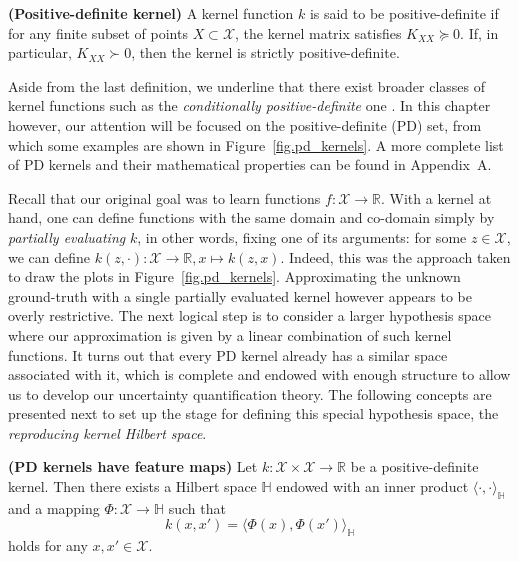 \begin{definition}
	\label{def.pd_kernel}
	\textbf{(Positive-definite kernel)} A kernel function $k$ is said to be positive-definite if for any finite subset of points $X \subset \mathcal{X}$, the kernel matrix satisfies $K_{XX} \succeq 0$. If, in particular, $K_{XX} \succ 0$, then the kernel is strictly positive-definite.
\end{definition}

Aside from the last definition, we underline that there exist broader classes of kernel functions such as the \textit{conditionally positive-definite} one \cite[§2.4]{scholkopf2002learning}\cite[§8]{wendland2004scattered}. In this chapter however, our attention will be focused on the positive-definite (PD) set, from which some examples are shown in Figure~\ref{fig.pd_kernels}. A more complete list of PD kernels and their mathematical properties can be found in Appendix~A.

Recall that our original goal was to learn functions $f: \mathcal{X} \rightarrow \mathbb{R}$. With a kernel at hand, one can define functions with the same domain and co-domain simply by \textit{partially evaluating} $k$, in other words, fixing one of its arguments: for some $z \in \mathcal{X}$, we can define $k(z,\cdot): \mathcal{X} \rightarrow \mathbb{R}, x \mapsto k(z,x)$. Indeed, this was the approach taken to draw the plots in Figure~\ref{fig.pd_kernels}. Approximating the unknown ground-truth with a single partially evaluated kernel however appears to be overly restrictive. The next logical step is to consider a larger hypothesis space where our approximation is given by a linear combination of such kernel functions. It turns out that every PD kernel already has a similar space associated with it, which is complete and endowed with enough structure to allow us to develop our uncertainty quantification theory. The following concepts are presented next to set up the stage for defining this special hypothesis space, the \textit{reproducing kernel Hilbert space}.


\begin{proposition}
	\label{thm.pd_kernels_feature_maps}
	\textbf{(PD kernels have feature maps)} 
	Let $k:\mathcal{X} \times \mathcal{X} \rightarrow \mathbb{R} $ be a positive-definite kernel. Then there exists a Hilbert space $\mathbb{H}$ endowed with an inner product $\langle \cdot,\cdot \rangle_\mathbb{H}$ and a mapping $\Phi :  \mathcal{X} \rightarrow \mathbb{H}$ such that 
	\begin{equation}
		k(x,x') = \langle \Phi(x),\Phi(x') \rangle_\mathbb{H}
	\end{equation}
	holds for any $x,x' \in \mathcal{X}$.
\end{proposition}

